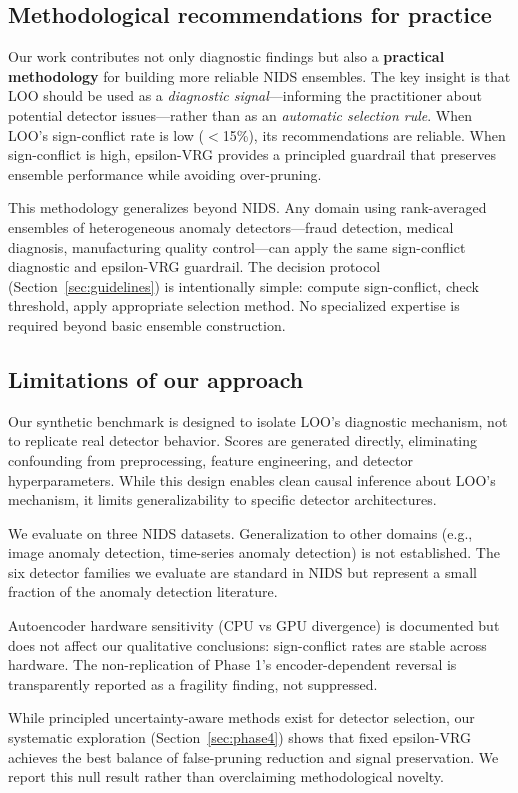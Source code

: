 \subsection{Methodological recommendations for practice}

Our work contributes not only diagnostic findings but also a \textbf{practical methodology} for building more reliable NIDS ensembles. The key insight is that LOO should be used as a \emph{diagnostic signal}---informing the practitioner about potential detector issues---rather than as an \emph{automatic selection rule}. When LOO's sign-conflict rate is low ($<$15\%), its recommendations are reliable. When sign-conflict is high, epsilon-VRG provides a principled guardrail that preserves ensemble performance while avoiding over-pruning.

This methodology generalizes beyond NIDS. Any domain using rank-averaged ensembles of heterogeneous anomaly detectors---fraud detection, medical diagnosis, manufacturing quality control---can apply the same sign-conflict diagnostic and epsilon-VRG guardrail. The decision protocol (Section~\ref{sec:guidelines}) is intentionally simple: compute sign-conflict, check threshold, apply appropriate selection method. No specialized expertise is required beyond basic ensemble construction.

\subsection{Limitations of our approach}

Our synthetic benchmark is designed to isolate LOO's diagnostic mechanism, not to replicate real detector behavior. Scores are generated directly, eliminating confounding from preprocessing, feature engineering, and detector hyperparameters. While this design enables clean causal inference about LOO's mechanism, it limits generalizability to specific detector architectures.

We evaluate on three NIDS datasets. Generalization to other domains (e.g., image anomaly detection, time-series anomaly detection) is not established. The six detector families we evaluate are standard in NIDS but represent a small fraction of the anomaly detection literature.

Autoencoder hardware sensitivity (CPU vs GPU divergence) is documented but does not affect our qualitative conclusions: sign-conflict rates are stable across hardware. The non-replication of Phase 1's encoder-dependent reversal is transparently reported as a fragility finding, not suppressed.

While principled uncertainty-aware methods exist for detector selection, our systematic exploration (Section~\ref{sec:phase4}) shows that fixed epsilon-VRG achieves the best balance of false-pruning reduction and signal preservation. We report this null result rather than overclaiming methodological novelty.
